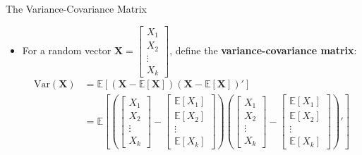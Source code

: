 \documentclass[aspectratio=169, handout, t]{beamer}
\numberwithin{equation}{section}
\begin{document}
\begin{frame}{The Variance-Covariance Matrix}
\begin{itemize}
\item For a random vector $\bm{X}=\begin{bmatrix} X_1 \\ X_2 \\ \vdots \\ X_k \end{bmatrix}$, define the \textbf{variance-covariance matrix}:
\begin{align*}
\text{Var}(\bm{X})&=\mathbb{E}[(\bm{X}-\mathbb{E}[\bm{X}])(\bm{X}-\mathbb{E}[\bm{X}])']\\
&=\mathbb{E}\!\left[\left(\begin{bmatrix} X_1 \\ X_2 \\ \vdots \\ X_k \end{bmatrix}-\begin{bmatrix} \mathbb{E}[X_1] \\ \mathbb{E}[X_2] \\ \vdots \\ \mathbb{E}[X_k] \end{bmatrix}\right)\left(\begin{bmatrix} X_1 \\ X_2 \\ \vdots \\ X_k \end{bmatrix}-\begin{bmatrix} \mathbb{E}[X_1] \\ \mathbb{E}[X_2] \\ \vdots \\ \mathbb{E}[X_k] \end{bmatrix}\right)'\right]
\end{align*}
\end{itemize}
\end{frame}
\end{document}
